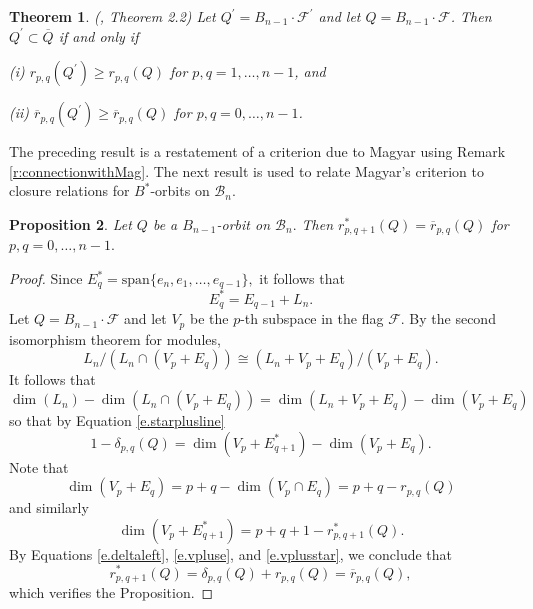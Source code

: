 \documentclass[12pt]{amsart}
\numberwithin{equation}{section}
\newtheorem{thm}{Theorem}[section]
\newtheorem{prop}[thm]{Proposition}
\newcommand{\B}{\mathcal{B}}
\newcommand{\F}{\mathcal{F}}
\begin{document}

\begin{thm}\label{thm:magyarorder}(\cite{Magyar}, Theorem 2.2)
Let $Q^{\prime}=B_{n-1}\cdot \F^{\prime}$ and let $Q=B_{n-1}\cdot \F$.  Then
$Q^{\prime} \subset \overline{Q}$ if and only if 
\par\noindent (i) $r_{p,q}(Q^{\prime}) \ge r_{p,q}(Q)$ for $p, q = 1, \dots, n-1$, and 
\par\noindent (ii) $\overline{r}_{p,q}(Q^{\prime}) \ge \overline{r}_{p,q}(Q)$ for $p,q = 0, \dots, n-1$.
\end{thm}
\noindent The preceding result is a restatement of a criterion due to Magyar using Remark \ref{r:connectionwithMag}. The next result is used to relate Magyar's criterion to closure relations for $B^{*}$-orbits on $\B_{n}$.

\begin{prop}\label{prop:rstarrbar}
Let $Q$ be a $B_{n-1}$-orbit on $\B_n.$  Then $r^*_{p,q+1}(Q)=\overline{r}_{p,q}(Q)$ for $p,q =0, \dots, n-1.$
\end{prop}

\begin{proof}
Since $E_q^*=\mbox{span}\{ e_n, e_1, \dots, e_{q-1}\},$ it follows that 
\begin{equation}\label{e.starplusline}
E_q^*=E_{q-1} + L_n.
\end{equation}
Let $Q=B_{n-1}\cdot \F$ and let $V_p$ be the $p$-th subspace in the flag $\F$.
   By the second isomorphism theorem for modules,
\begin{equation}
L_n/(L_n \cap (V_p + E_q)) \cong (L_n + V_p + E_q)/(V_p + E_q).
\end{equation}
It follows that
\begin{equation}
  \dim(L_n)-\dim(L_n\cap (V_p + E_q)) = \dim(L_n + V_p + E_q) - \dim(V_p + E_q)
\end{equation}
so that by Equation \eqref{e.starplusline}
\begin{equation}\label{e.deltaleft}
1 - \delta_{p,q}(Q) = \dim(V_p + E_{q+1}^*) - \dim(V_p + E_q).
\end{equation}
Note that 
\begin{equation}\label{e.vpluse}
\dim(V_p + E_q) = p + q - \dim(V_p \cap E_q)=p+q-r_{p,q}(Q)
\end{equation}
and similarly
\begin{equation}\label{e.vplusstar}
\dim(V_p + E_{q+1}^*)=p+q+1-r^*_{p,q+1}(Q).
\end{equation}
By Equations \eqref{e.deltaleft}, \eqref{e.vpluse}, and \eqref{e.vplusstar}, we conclude that 
$$r^*_{p,q+1}(Q)=\delta_{p,q}(Q) + r_{p,q}(Q) = \overline{r}_{p,q}(Q),$$ which verifies the Proposition.
\end{proof}
\end{document}
